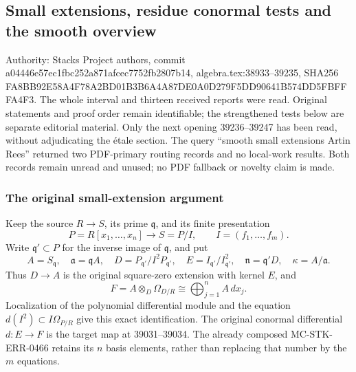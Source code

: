 \subsection{Small extensions, residue conormal tests and the smooth overview}\label{algebra-proof-050-small-extensions-residue-conormal-tests-and-the-smooth-overview}

Authority: Stacks Project authors, commit a044\allowbreak{}46e5\allowbreak{}7ec1\allowbreak{}fbc2\allowbreak{}52a8\allowbreak{}71af\allowbreak{}cec7\allowbreak{}752f\allowbreak{}b280\allowbreak{}7b14, algebra.\AlgebraIdentifierBreak{}tex:\AlgebraIdentifierBreak{}38933--\AlgebraIdentifierBreak{}39235, SHA256 FA8B\allowbreak{}B92E\allowbreak{}58A4\allowbreak{}F78A\allowbreak{}2BD0\allowbreak{}1B3B\allowbreak{}6A4A\allowbreak{}87DE\allowbreak{}0A0D\allowbreak{}279F\allowbreak{}5DD9\allowbreak{}0641\allowbreak{}B574\allowbreak{}DD5F\allowbreak{}BFFF\allowbreak{}A4F3. The whole interval and thirteen received reports were read. Original statements and proof order remain identifiable; the strengthened tests below are separate editorial material. Only the next opening 39236--39247 has been read, without adjudicating the étale section. The query ``smooth small extensions Artin Rees'' returned two PDF-primary routing records and no local-work results. Both records remain unread and unused; no PDF fallback or novelty claim is made.

\subsubsection{The original small-extension argument}\label{algebra-proof-050-the-original-small-extension-argument}

Keep the source \(R\to S\), its prime \(\mathfrak q\), and its finite presentation \[
P=R[x_1,\ldots,x_n]\longrightarrow S=P/I,\qquad
I=(f_1,\ldots,f_m).
\] Write \(\mathfrak q'\subset P\) for the inverse image of \(\mathfrak q\), and put \[
A=S_{\mathfrak q},\quad \mathfrak a=\mathfrak q A,\quad
D=P_{\mathfrak q'}/I^2P_{\mathfrak q'},\quad
E=I_{\mathfrak q'}/I_{\mathfrak q'}^2,\quad
\mathfrak n=\mathfrak q'D,\quad \kappa=A/\mathfrak a.
\] Thus \(D\to A\) is the original square-zero extension with kernel \(E\), and \[
F=A\otimes_D\Omega_{D/R}\cong
\bigoplus_{j=1}^n A\,dx_j.
\] Localization of the polynomial differential module and the equation \(d(I^2)\subset I\Omega_{P/R}\) give this exact identification. The original conormal differential \(d:E\to F\) is the target map at 39031--39034. The already composed MC-\AlgebraIdentifierBreak{}STK-\AlgebraIdentifierBreak{}ERR-\AlgebraIdentifierBreak{}0466 retains its \(n\) basis elements, rather than replacing that number by the \(m\) equations.

